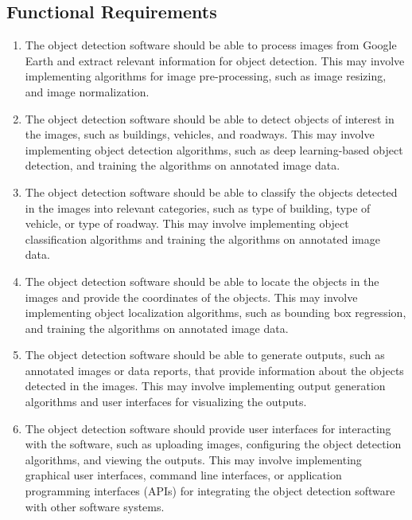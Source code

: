 	
	
	\subsection{Functional Requirements}
	\begin{enumerate}
		\item The object detection software should be able to process images from Google Earth and extract relevant information for object detection. This may involve implementing algorithms for image pre-processing, such as image resizing, and image normalization.
		\item The object detection software should be able to detect objects of interest in the images, such as buildings, vehicles, and roadways. This may involve implementing object detection algorithms, such as deep learning-based object detection, and training the algorithms on annotated image data.
		\item The object detection software should be able to classify the objects detected in the images into relevant categories, such as type of building, type of vehicle, or type of roadway. This may involve implementing object classification algorithms and training the algorithms on annotated image data.
		\item The object detection software should be able to locate the objects in the images and provide the coordinates of the objects. This may involve implementing object localization algorithms, such as bounding box regression, and training the algorithms on annotated image data.
		\item The object detection software should be able to generate outputs, such as annotated images or data reports, that provide information about the objects detected in the images. This may involve implementing output generation algorithms and user interfaces for visualizing the outputs.
		\item The object detection software should provide user interfaces for interacting with the software, such as uploading images, configuring the object detection algorithms, and viewing the outputs. This may involve implementing graphical user interfaces, command line interfaces, or application programming interfaces (APIs) for integrating the object detection software with other software systems.
	\end{enumerate}
	
	
	
	
	
	
	
